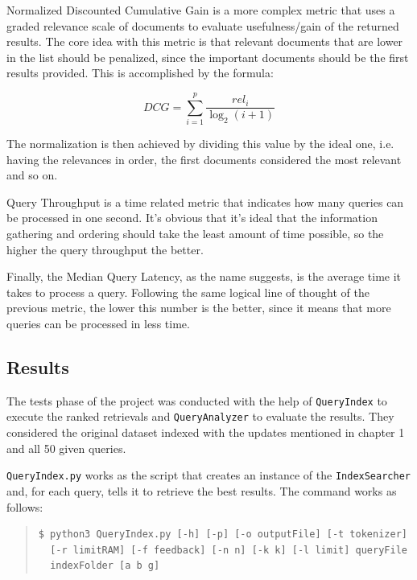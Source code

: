 \documentclass[12pt]{article}
\begin{document}
Normalized Discounted Cumulative Gain is a more complex metric that uses a graded 
relevance scale of documents to evaluate usefulness/gain of the returned results. 
The core idea with this metric is that relevant documents that are lower in the 
list should be penalized, since the important documents should be the first 
results provided. 
This is accomplished by the formula:

\begin{equation}
  DCG = \sum_{i=1}^{p} \frac{rel_{i}}{\log_{2}(i+1)}
\end{equation}

The normalization is then achieved by dividing this value by the ideal one, i.e.
having the relevances in order, the first documents considered the most relevant 
and so on.

Query Throughput is a time related metric that indicates how many queries can be 
processed in one second. 
It's obvious that it's ideal that the information gathering and ordering should 
take the least amount of time possible, so the higher the query throughput the better.

Finally, the Median Query Latency, as the name suggests, is the average time it
takes to process a query. 
Following the same logical line of thought of the previous metric, the lower 
this number is the better, since it means that more queries can be processed in 
less time.

\subsection{Results}

The tests phase of the project was conducted with the help of \texttt{QueryIndex}
to execute the ranked retrievals and \texttt{QueryAnalyzer} to evaluate the results.
They considered the original dataset indexed with the updates mentioned in chapter 
1 and all 50 given queries.

\texttt{QueryIndex.py} works as the script that creates an instance of the 
\texttt{IndexSearcher} and, for each query, tells it to retrieve the best results.
The command works as follows:

\begingroup
\addtolength\leftmargini{-0.4in}
\addtolength\baselineskip{-0.05in}
\begin{quote}
\begin{verbatim}
$ python3 QueryIndex.py [-h] [-p] [-o outputFile] [-t tokenizer] 
  [-r limitRAM] [-f feedback] [-n n] [-k k] [-l limit] queryFile 
  indexFolder [a b g]
\end{verbatim}
\end{quote}
\endgroup
\end{document}
